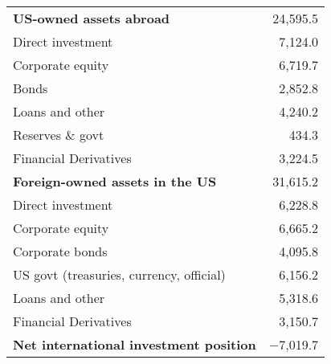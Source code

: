 
\begin{tabular*}{0.8\textwidth}{l@{\extracolsep{\fill}}r}
\toprule
{\bf US-owned assets abroad}            &  24,595.5 \\
\hspace{5mm}Direct investment           &  7,124.0 \\
\hspace{5mm}Corporate equity            &  6,719.7 \\
\hspace{5mm}Bonds\index{bond}           &  2,852.8 \\
\hspace{5mm}Loans and other             &  4,240.2 \\
\hspace{5mm}Reserves \& govt            &  434.3 \\
\hspace{5mm}Financial Derivatives       & 3,224.5 \\
\addlinespace
{\bf Foreign-owned assets in the US}    & 31,615.2 \\
\hspace{5mm}Direct investment           & 6,228.8 \\
\hspace{5mm}Corporate equity            & 6,665.2  \\
\hspace{5mm}Corporate bonds\index{bond} & 4,095.8 \\
\hspace{5mm}US govt (treasuries, currency, official) &  6,156.2  \\
\hspace{5mm}Loans and other             &  5,318.6      \\
\hspace{5mm}Financial Derivatives       & 3,150.7 \\
\addlinespace
{\bf Net international investment position} &  $-$7,019.7  \\
\bottomrule
\end{tabular*}
